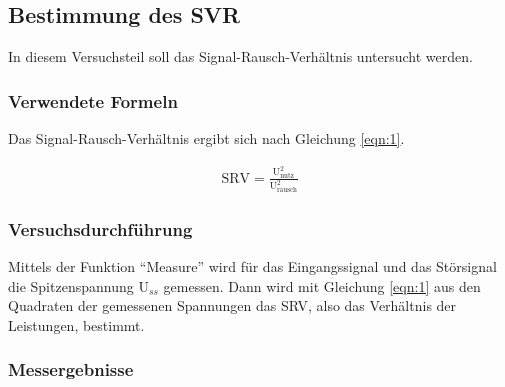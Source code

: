 \documentclass[12pt,a4paper]{article}
\begin{document}
\subsection{Bestimmung des SVR}

In diesem Versuchsteil soll das Signal-Rausch-Verhältnis untersucht werden.

\subsubsection*{Verwendete Formeln}

Das Signal-Rausch-Verhältnis ergibt sich nach Gleichung \ref{eqn:1}.

\begin{align}
\text{SRV}=\frac{\text{U}_\text{nutz}^2}{\text{U}_\text{rausch}^2}
\label{eqn:1}
\end{align}


\subsubsection*{Versuchsdurchführung}

Mittels der Funktion "`Measure"' wird für das Eingangssignal und das Störsignal die  Spitzenspannung U$_{ss}$ gemessen. Dann wird mit Gleichung \ref{eqn:1} aus den Quadraten der gemessenen Spannungen das SRV, also das Verhältnis der Leistungen, bestimmt.

\subsubsection*{Messergebnisse}
\end{document}
